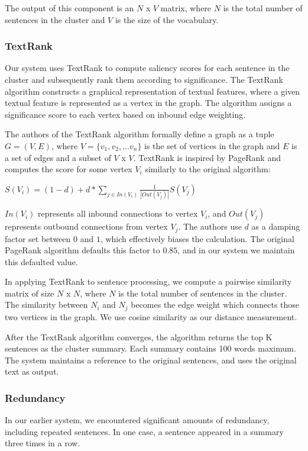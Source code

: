 \documentclass[11pt]{article}
\begin{document}
The output of this component is an $N$ x $V$ matrix, where $N$ is the total number of sentences in the cluster and $V$ is the size of the vocabulary. 
\subsubsection{TextRank}
Our system uses TextRank to compute saliency scores for each sentence in the cluster and subsequently rank them according to significance. The TextRank algorithm constructs a graphical representation of textual features, where a given textual feature is represented as a vertex in the graph. The algorithm assigns a significance score to each vertex based on inbound edge weighting.

The authors of the TextRank algorithm formally define a graph as a tuple $G = (V,E)$, where $V = \{v_1, v_2, ... v_n\}$ is the set of vertices in the graph and $E$ is a set of edges and a subset of $V$ x $V$. TextRank is inspired by PageRank and computes the score for some vertex $V_i$ similarly to the original algorithm:
\begin{center}
    $S(V_i) = (1 - d) + d * \sum_{j \in In(V_i)} \frac{1}{|Out(V_j)|}S(V_j)$
\end{center}
$In(V_i)$ represents all inbound connections to vertex $V_i$, and $Out(V_j)$ represents outbound connections from vertex $V_j$. The authors use $d$ as a damping factor set between $0$ and $1$, which effectively biases the calculation. The original PageRank algorithm defaults this factor to $0.85$, and in our system we maintain this defaulted value.

In applying TextRank to sentence processing, we compute a pairwise similarity matrix of size $N$ x $N$, where $N$ is the total number of sentences in the cluster. The similarity between $N_i$ and $N_j$ becomes the edge weight which connects those two vertices in the graph. We use cosine similarity as our distance measurement.

After the TextRank algorithm converges, the algorithm returns the top K sentences as the cluster summary. Each summary contains 100 words maximum. The system maintains a 
reference to the original sentences, and uses the original text as output.

\subsubsection{Redundancy}
In our earlier system, we encountered significant amounts of redundancy, including repeated sentences. In one case, a sentence appeared in a summary three times in a row. 
\end{document}
